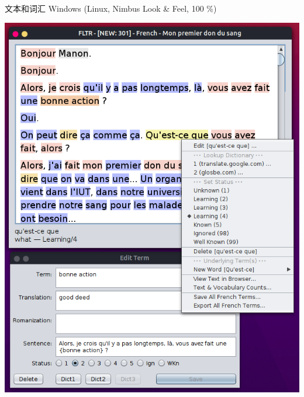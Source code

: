 \documentclass[cn,10pt,math=newtx,citestyle=gb7714-2015,bibstyle=gb7714-2015]{elegantbook}
\begin{document}
文本和词汇 Windows (Linux, Nimbus Look \& Feel, 100 \%)

\includegraphics[scale=0.5]{image/images-014.png}
\end{document}
